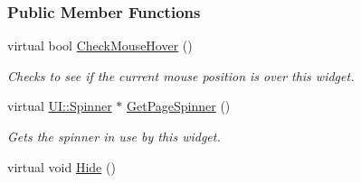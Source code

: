 \subsubsection*{Public Member Functions}
\begin{DoxyCompactItemize}
\item 
virtual bool \hyperlink{classphys_1_1UI_1_1PagedCellGrid_a859ed3c174faf86962df4d0fd2b43fab}{CheckMouseHover} ()
\begin{DoxyCompactList}\small\item\em Checks to see if the current mouse position is over this widget. \item\end{DoxyCompactList}\item 
virtual \hyperlink{classphys_1_1UI_1_1Spinner}{UI::Spinner} $\ast$ \hyperlink{classphys_1_1UI_1_1PagedCellGrid_a6d21af1cc6490d1aacbb054dd5fdd555}{GetPageSpinner} ()
\begin{DoxyCompactList}\small\item\em Gets the spinner in use by this widget. \item\end{DoxyCompactList}\item 
\hypertarget{classphys_1_1UI_1_1PagedCellGrid_ae4cbcf05df48dfcb0871f4d3604010ec}{
virtual void \hyperlink{classphys_1_1UI_1_1PagedCellGrid_ae4cbcf05df48dfcb0871f4d3604010ec}{Hide} ()}
\label{classphys_1_1UI_1_1PagedCellGrid_ae4cbcf05df48dfcb0871f4d3604010ec}


\end{DoxyCompactItemize}
